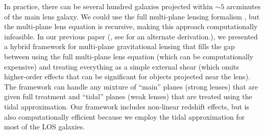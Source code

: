 In practice, there can be several hundred galaxies projected within $\sim5$ arcminutes of the main lens galaxy. We could use the full multi-plane lensing formalism \citep{PLW}, but the multi-plane lens equation is recursive, making this approach computationally infeasible.
In our previous paper (\citealp{McCully14}, see \citealt{Schneider14} for an alternate derivation.), we presented a hybrid framework for multi-plane gravitational lensing that fills the gap between using the full multi-plane lens equation (which can be computationally expensive) and treating everything as a simple external shear (which omits higher-order effects that can be significant for objects projected near the lens). The framework can handle any mixture of ``main'' planes (strong lenses) that are given full treatment and ``tidal'' planes (weak lenses) that are treated using the tidal approximation. Our framework includes non-linear redshift effects, but is also computationally efficient because we employ the tidal approximation for most of the LOS galaxies.
  
  